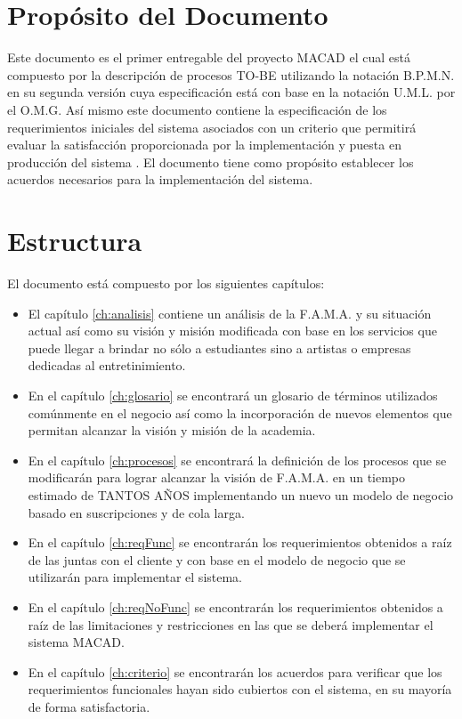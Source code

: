 
\section{Propósito del Documento}

Este documento es el primer entregable del proyecto MACAD el cual está compuesto por la descripción de procesos TO-BE utilizando la notación B.P.M.N. en su segunda versión cuya especificación está con base en la notación U.M.L. por el O.M.G. Así mismo este documento contiene la especificación de los requerimientos iniciales del sistema asociados con un criterio que permitirá evaluar la satisfacción proporcionada por la implementación y puesta en producción del sistema \varSistema. El documento tiene como propósito establecer los acuerdos necesarios para la implementación del sistema. 


\section{Estructura}

El documento está compuesto por los siguientes capítulos:

\begin{itemize}
	\item El capítulo \ref{ch:analisis} contiene un análisis de la F.A.M.A. y su situación actual así como su visión y misión modificada con base en los servicios que puede llegar a brindar no sólo a estudiantes sino a artistas o empresas dedicadas al entretinimiento.
	
	\item En el capítulo \ref{ch:glosario} se encontrará un glosario de términos utilizados comúnmente en el negocio así como la incorporación de nuevos elementos que permitan alcanzar la visión y misión de la academia.
	
	\item En el capítulo \ref{ch:procesos} se encontrará la definición de los procesos que se modificarán para lograr alcanzar la visión de F.A.M.A. en un tiempo estimado de TANTOS AÑOS implementando un nuevo un modelo de negocio basado en suscripciones y de cola larga.
	
	\item En el capítulo \ref{ch:reqFunc} se encontrarán los requerimientos obtenidos a raíz de las juntas con el cliente y con base en el modelo de negocio que se utilizarán para implementar el sistema.
	
	\item En el capítulo \ref{ch:reqNoFunc} se encontrarán los requerimientos obtenidos a raíz de las limitaciones y restricciones en las que se deberá implementar el sistema MACAD.
	
	\item En el capítulo \ref{ch:criterio} se encontrarán los acuerdos para verificar que los requerimientos funcionales hayan sido cubiertos con el sistema, en su mayoría de forma satisfactoria.
\end{itemize}


